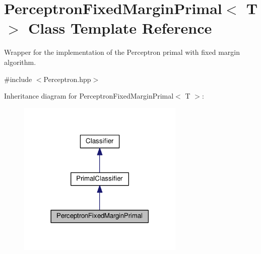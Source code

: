 \hypertarget{class_perceptron_fixed_margin_primal}{}\section{Perceptron\+Fixed\+Margin\+Primal$<$ T $>$ Class Template Reference}
\label{class_perceptron_fixed_margin_primal}


Wrapper for the implementation of the Perceptron primal with fixed margin algorithm.  




{\ttfamily \#include $<$Perceptron.\+hpp$>$}



Inheritance diagram for Perceptron\+Fixed\+Margin\+Primal$<$ T $>$\+:\nopagebreak
\begin{figure}[H]
\begin{center}
\leavevmode
\includegraphics[width=225pt]{class_perceptron_fixed_margin_primal__inherit__graph}
\end{center}
\end{figure}


